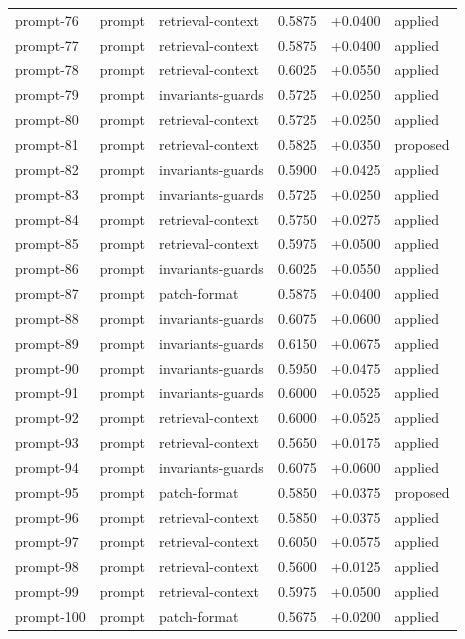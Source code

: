 \begin{center}
\begin{longtable}{llp{5.2cm}rrl}
prompt-76 & prompt & retrieval-context & 0.5875 & +0.0400 & applied \\
prompt-77 & prompt & retrieval-context & 0.5875 & +0.0400 & applied \\
prompt-78 & prompt & retrieval-context & 0.6025 & +0.0550 & applied \\
prompt-79 & prompt & invariants-guards & 0.5725 & +0.0250 & applied \\
prompt-80 & prompt & retrieval-context & 0.5725 & +0.0250 & applied \\
prompt-81 & prompt & retrieval-context & 0.5825 & +0.0350 & proposed \\
prompt-82 & prompt & invariants-guards & 0.5900 & +0.0425 & applied \\
prompt-83 & prompt & invariants-guards & 0.5725 & +0.0250 & applied \\
prompt-84 & prompt & retrieval-context & 0.5750 & +0.0275 & applied \\
prompt-85 & prompt & retrieval-context & 0.5975 & +0.0500 & applied \\
prompt-86 & prompt & invariants-guards & 0.6025 & +0.0550 & applied \\
prompt-87 & prompt & patch-format & 0.5875 & +0.0400 & applied \\
prompt-88 & prompt & invariants-guards & 0.6075 & +0.0600 & applied \\
prompt-89 & prompt & invariants-guards & 0.6150 & +0.0675 & applied \\
prompt-90 & prompt & invariants-guards & 0.5950 & +0.0475 & applied \\
prompt-91 & prompt & invariants-guards & 0.6000 & +0.0525 & applied \\
prompt-92 & prompt & retrieval-context & 0.6000 & +0.0525 & applied \\
prompt-93 & prompt & retrieval-context & 0.5650 & +0.0175 & applied \\
prompt-94 & prompt & invariants-guards & 0.6075 & +0.0600 & applied \\
prompt-95 & prompt & patch-format & 0.5850 & +0.0375 & proposed \\
prompt-96 & prompt & retrieval-context & 0.5850 & +0.0375 & applied \\
prompt-97 & prompt & retrieval-context & 0.6050 & +0.0575 & applied \\
prompt-98 & prompt & retrieval-context & 0.5600 & +0.0125 & applied \\
prompt-99 & prompt & retrieval-context & 0.5975 & +0.0500 & applied \\
prompt-100 & prompt & patch-format & 0.5675 & +0.0200 & applied \\
\bottomrule\end{longtable}\end{center}
\clearpage
